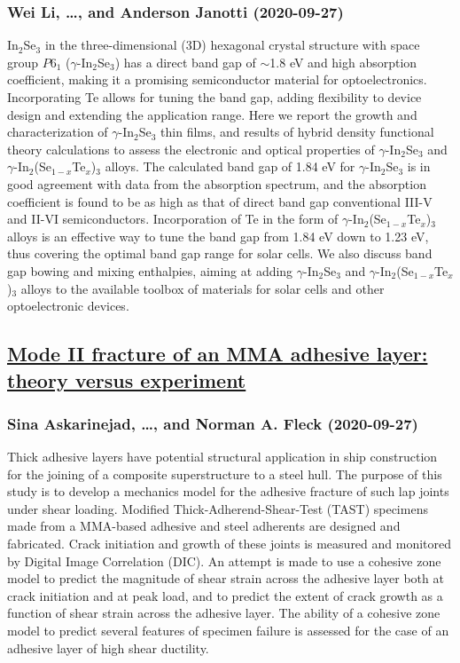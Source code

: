 \subsubsection*{Wei Li, \dots, and Anderson Janotti (2020-09-27)}
In$_2$Se$_3$ in the three-dimensional (3D) hexagonal crystal structure with
space group $P6_1$ ($\gamma$-In$_2$Se$_3$) has a direct band gap of $\sim$1.8
eV and high absorption coefficient, making it a promising semiconductor
material for optoelectronics. Incorporating Te allows for tuning the band gap,
adding flexibility to device design and extending the application range. Here
we report the growth and characterization of $\gamma$-In$_2$Se$_3$ thin films,
and results of hybrid density functional theory calculations to assess the
electronic and optical properties of $\gamma$-In$_2$Se$_3$ and
$\gamma$-In$_2$(Se$_{1-x}$Te$_x$)$_3$ alloys. The calculated band gap of 1.84
eV for $\gamma$-In$_2$Se$_3$ is in good agreement with data from the absorption
spectrum, and the absorption coefficient is found to be as high as that of
direct band gap conventional III-V and II-VI semiconductors. Incorporation of
Te in the form of $\gamma$-In$_2$(Se$_{1-x}$Te$_x$)$_3$ alloys is an effective
way to tune the band gap from 1.84 eV down to 1.23 eV, thus covering the
optimal band gap range for solar cells. We also discuss band gap bowing and
mixing enthalpies, aiming at adding $\gamma$-In$_2$Se$_3$ and
$\gamma$-In$_2$(Se$_{1-x}$Te$_x$)$_3$ alloys to the available toolbox of
materials for solar cells and other optoelectronic devices.

\subsection*{\href{http://arxiv.org/abs/2009.12883v1}{Mode II fracture of an MMA adhesive layer: theory versus experiment}}
\subsubsection*{Sina Askarinejad, \dots, and Norman A. Fleck (2020-09-27)}
Thick adhesive layers have potential structural application in ship
construction for the joining of a composite superstructure to a steel hull. The
purpose of this study is to develop a mechanics model for the adhesive fracture
of such lap joints under shear loading. Modified Thick-Adherend-Shear-Test
(TAST) specimens made from a MMA-based adhesive and steel adherents are
designed and fabricated. Crack initiation and growth of these joints is
measured and monitored by Digital Image Correlation (DIC). An attempt is made
to use a cohesive zone model to predict the magnitude of shear strain across
the adhesive layer both at crack initiation and at peak load, and to predict
the extent of crack growth as a function of shear strain across the adhesive
layer. The ability of a cohesive zone model to predict several features of
specimen failure is assessed for the case of an adhesive layer of high shear
ductility.

